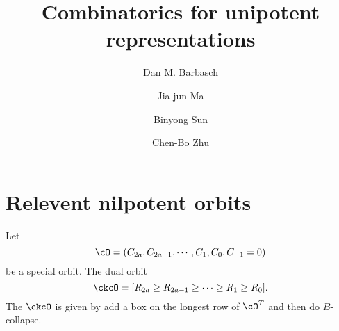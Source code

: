 \documentclass[12pt,a4paper]{amsart}
\numberwithin{equation}{section}
\theoremstyle{remark}
\begin{document}
\title[]{Combinatorics for unipotent representations}

\author [D. Barbasch] {Dan M. Barbasch}
\address{the Department of Mathematics\\
  310 Malott Hall, Cornell University, Ithaca, New York 14853 }

\author [J.-J. Ma] {Jia-jun Ma}
\address{School of Mathematical Sciences\\
  Shanghai Jiao Tong University\\
  800 Dongchuan Road, Shanghai, 200240, China} 

\author [B. Sun] {Binyong Sun}
\address{Academy of Mathematics and Systems Science\\
  Chinese Academy of Sciences\\
  Beijing, 100190, China} 

\author [C.-B. Zhu] {Chen-Bo Zhu}
\address{Department of Mathematics\\
  National University of Singapore\\
  10 Lower Kent Ridge Road, Singapore 119076} 




 

\maketitle


\tableofcontents
\section{Relevent nilpotent orbits}

Let
\[\cO=(C_{2a},C_{2a-1}, \cdots, C_1,C_0,C_{-1}=0)\]
be a special orbit.  The dual orbit
\[ \ckcO = [R_{2a}\geq R_{2a-1}\geq \cdots \geq R_1\geq R_0].\] The $\ckcO$ is
given by add a box on the longest row of $\cO^T$ and then do $B$-collapse.
\end{document}

